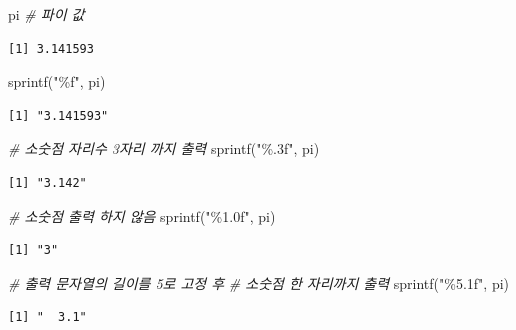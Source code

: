\documentclass[
  11pt,
]{krantz}
\newenvironment{Shaded}{\begin{snugshade}}{\end{snugshade}}
\newcommand{\CommentTok}[1]{\textcolor[rgb]{0.37,0.37,0.37}{\textit{#1}}}
\newcommand{\FunctionTok}[1]{\textcolor[rgb]{0,0,0}{#1}}
\newcommand{\NormalTok}[1]{#1}
\newcommand{\StringTok}[1]{\textcolor[rgb]{0.5,0.5,0.5}{#1}}
\begin{document}
\begin{Shaded}
\begin{Highlighting}[]
\NormalTok{pi }\CommentTok{\# 파이 값}
\end{Highlighting}
\end{Shaded}

\begin{verbatim}
[1] 3.141593
\end{verbatim}

\begin{Shaded}
\begin{Highlighting}[]
\FunctionTok{sprintf}\NormalTok{(}\StringTok{"\%f"}\NormalTok{, pi) }
\end{Highlighting}
\end{Shaded}

\begin{verbatim}
[1] "3.141593"
\end{verbatim}

\begin{Shaded}
\begin{Highlighting}[]
\CommentTok{\# 소숫점 자리수 3자리 까지 출력}
\FunctionTok{sprintf}\NormalTok{(}\StringTok{"\%.3f"}\NormalTok{, pi)}
\end{Highlighting}
\end{Shaded}

\begin{verbatim}
[1] "3.142"
\end{verbatim}

\begin{Shaded}
\begin{Highlighting}[]
\CommentTok{\# 소숫점 출력 하지 않음}
\FunctionTok{sprintf}\NormalTok{(}\StringTok{"\%1.0f"}\NormalTok{, pi)}
\end{Highlighting}
\end{Shaded}

\begin{verbatim}
[1] "3"
\end{verbatim}

\begin{Shaded}
\begin{Highlighting}[]
\CommentTok{\# 출력 문자열의 길이를 5로 고정 후}
\CommentTok{\# 소숫점 한 자리까지 출력}
\FunctionTok{sprintf}\NormalTok{(}\StringTok{"\%5.1f"}\NormalTok{, pi)}
\end{Highlighting}
\end{Shaded}

\begin{verbatim}
[1] "  3.1"
\end{verbatim}
\end{document}
